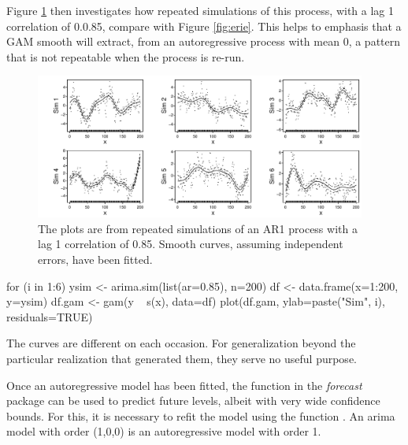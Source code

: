 Figure \ref{fig:ar1fits} then investigates how repeated simulations of
this process, with a lag 1 correlation of 0.0.85, compare with Figure
\ref{fig:erie}.  This helps to emphasis that a GAM smooth will
extract, from an autoregressive process with mean 0, a pattern that is
not repeatable when the process is re-run.

\begin{figure}
\begin{Schunk}


\centerline{\includegraphics[width=0.97\textwidth]{figs/12-arima-sim-1} }

\end{Schunk}
\caption{The plots are from repeated simulations of an AR1 process with a
  lag 1 correlation of 0.85.  Smooth curves, assuming independent
  errors, have been fitted.}\label{fig:ar1fits}
\end{figure}

\begin{marginfigure}[18pt]
\begin{Schunk}
\begin{Sinput}
for (i in 1:6){
ysim <-
  arima.sim(list(ar=0.85),
            n=200)
df <- data.frame(x=1:200,
                 y=ysim)
df.gam <- gam(y ~ s(x),
              data=df)
plot(df.gam,
     ylab=paste("Sim", i),
     residuals=TRUE)
}
\end{Sinput}
\end{Schunk}
\end{marginfigure}

The curves are different on each occasion.  For generalization beyond
the particular realization that generated them, they serve no useful
purpose.

Once an autoregressive model has been fitted, the function
 in the \textit{forecast} package can be used to
predict future levels, albeit with very wide confidence bounds.
For this, it is necessary to refit the model using the function
. An arima model with order (1,0,0) is an autoregressive
model with order 1.
\vspace*{10pt}

